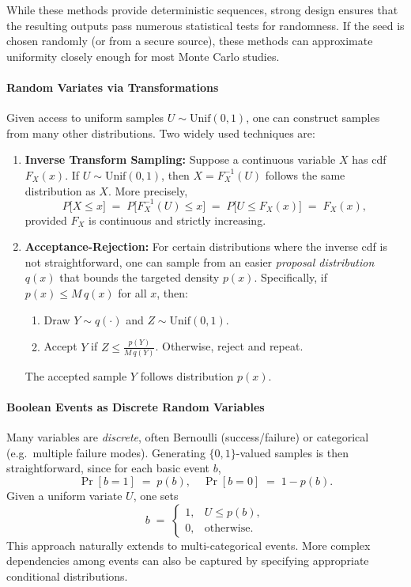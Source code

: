 While these methods provide deterministic sequences, strong design ensures that the resulting outputs pass numerous statistical tests for randomness. If the seed is chosen randomly (or from a secure source), these methods can approximate uniformity closely enough for most Monte Carlo studies.

\paragraph{Random Variates via Transformations}
Given access to uniform samples \(U\sim \mathrm{Unif}(0,1)\), one can construct samples from many other distributions. Two widely used techniques are:

\begin{enumerate}
\item \textbf{Inverse Transform Sampling:}  
   Suppose a continuous variable \(X\) has \acrfull{cdf} \(F_X(x)\). If \(U\sim \mathrm{Unif}(0,1)\), then \(X=F_X^{-1}(U)\) follows the same distribution as \(X\). More precisely,
   \[
   P\bigl[X \le x\bigr]
   \;=\;
   P\bigl[F_X^{-1}(U)\le x\bigr]
   \;=\;
   P\bigl[U \le F_X(x)\bigr]
   \;=\;
   F_X(x),
   \]
   provided \(F_X\) is continuous and strictly increasing.  

\item \textbf{Acceptance-Rejection:}  
   For certain distributions where the inverse \acrshort{cdf} is not straightforward, one can sample from an easier \emph{proposal distribution} \(q(x)\) that bounds the targeted density \(p(x)\). Specifically, if \(p(x)\le M\,q(x)\) for all \(x\), then:
   \begin{enumerate}
   \item Draw \(Y\sim q(\cdot)\) and \(Z\sim \mathrm{Unif}(0,1)\).
   \item Accept \(Y\) if \(Z\le \frac{p(Y)}{M\,q(Y)}\). Otherwise, reject and repeat.
   \end{enumerate}
   The accepted sample \(Y\) follows distribution \(p(x)\).  
\end{enumerate}

\paragraph{Boolean Events as Discrete Random Variables}
Many variables are \emph{discrete}, often Bernoulli (success/failure) or categorical (e.g.\ multiple failure modes). Generating \(\{0,1\}\)-valued samples is then straightforward, since for each basic event \(b\),
\[
\Pr[b=1] \;=\; p(b),
\quad
\Pr[b=0] \;=\; 1-p(b).
\]
Given a uniform variate \(U\), one sets
\[
b
\;=\;
\begin{cases}
1, & U \le p(b),\\
0, & \text{otherwise}.
\end{cases}
\]
This approach naturally extends to multi-categorical events. More complex dependencies among events can also be captured by specifying appropriate conditional distributions.

